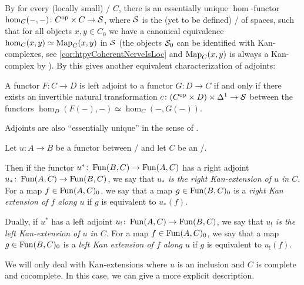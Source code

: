 \begin{remark}\label{rmk:homAdjunction}
    By \cite[248]{cisinski_2019} for every (locally small) \inftycat/ $C$, there is an essentially unique $\hom$-functor $\hom_C(-,-)\colon C^{\operatorname{op}}\times C\to\mathcal{S}$, where $\mathcal{S}$ is the (yet to be defined) \inftycat/ of spaces, such that for all objects $x,y\in C_0$ we have a canonical equivalence $\hom_C(x,y)\simeq\operatorname{Map}_C(x,y)$ in $\mathcal{S}$ (the objects $\mathcal{S}_0$ can be identified with Kan-complexes, see \cref{cor:htpyCoherentNerveIsLoc} and $\operatorname{Map}_C(x,y)$ is always a Kan-complex by \cite[116]{cisinski_2019}).
    By \cite[Theorem 6.1.23]{cisinski_2019} this gives another equivalent characterization of adjoints:
    
    A functor $F\colon C\to D$ is left adjoint to a functor $G\colon D\to C$ if and only if there exists an invertible natural transformation $c\colon (C^{\operatorname{op}}\times D)\times\Delta^1 \to\mathcal{S}$ between the functors $\hom_D(F(-),-)\simeq\hom_C(-,G(-))$.

    Adjoints are also ``essentially unique'' in the sense of \cite[Proposition 6.1.9]{cisinski_2019}.
\end{remark}
\begin{definition}
    Let $u\colon A\to B$ be a functor between \inftycats/ and let $C$ be an \inftycat/.
    
    Then if the functor $u^*\colon\operatorname{Fun}(B,C)\to\operatorname{Fun}(A,C)$ has a right adjoint $u_*\colon\operatorname{Fun}(A,C)\to\operatorname{Fun}(B,C)$, we say that \emph{$u_*$ is the right Kan-extension of $u$ in $C$}.
    For a map $f\in\operatorname{Fun}(A,C)_0$, we say that a map $g\in\operatorname{Fun}(B,C)_0$ is a \emph{right Kan extension of $f$ along $u$} if $g$ is equivalent to $u_*(f)$.

    Dually, if $u^*$ has a left adjoint $u_!\colon\operatorname{Fun}(A,C)\to\operatorname{Fun}(B,C)$, we say that \emph{$u_!$ is the left Kan-extension of $u$ in $C$}.
    For a map $f\in\operatorname{Fun}(A,C)_0$, we say that a map $g\in\operatorname{Fun}(B,C)_0$ is a \emph{left Kan extension of $f$ along $u$} if $g$ is equivalent to $u_!(f)$.
\end{definition}
We will only deal with Kan-extensions where $u$ is an inclusion and $C$ is complete and cocomplete.
In this case, we can give a more explicit description.
